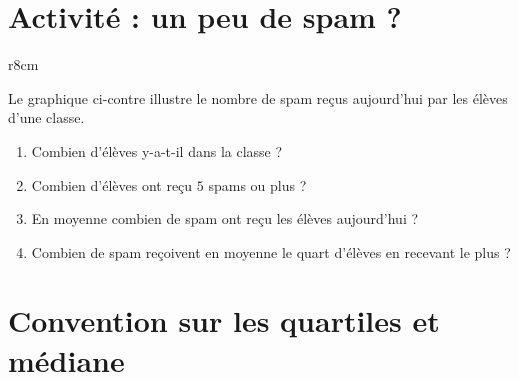 



\setcounter{section}{-1}
\section{Activité : un peu de spam ?}

\begin{wrapfigure}[5]{r}{8cm}
   \vspace{-0.5cm}        %
   \centering
   
\end{wrapfigure}

Le graphique ci-contre illustre le nombre de spam reçus aujourd'hui par les élèves d'une classe.
\begin{enumerate}
    \item
        Combien d'élèves y-a-t-il dans la classe ?
    \item
        Combien d'élèves ont reçu \( 5\) spams ou plus ?
    \item
        En moyenne combien de spam ont reçu les élèves aujourd'hui ?
    \item
        Combien de spam reçoivent en moyenne le quart d'élèves en recevant le plus ?
\end{enumerate}

\section{Convention sur les quartiles et médiane}

